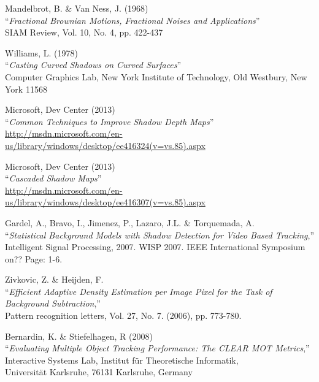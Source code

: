 \begin{thebibliography}{9}

	Mandelbrot, B. \& Van Ness, J. (1968) \\ 
	``\textit{Fractional Brownian Motions, Fractional Noises and Applications}'' \\
	SIAM Review, Vol. 10, No. 4, pp. 422-437
	
	Williams, L. (1978) \\ 
	``\textit{Casting Curved Shadows on Curved Surfaces}'' \\
	Computer Graphics Lab, New York Institute of Technology, Old Westbury, New York 11568 
	
	Microsoft, Dev Center (2013) \\ 
	``\textit{Common Techniques to Improve Shadow Depth Maps}'' \\
	\href{http://msdn.microsoft.com/en-us/library/windows/desktop/ee416324(v=vs.85).aspx}{http://msdn.microsoft.com/en-us/library/windows/desktop/ee416324(v=vs.85).aspx}
	
	Microsoft, Dev Center (2013) \\ 
	``\textit{Cascaded Shadow Maps}'' \\
	\href{http://msdn.microsoft.com/en-us/library/windows/desktop/ee416307(v=vs.85).aspx}{http://msdn.microsoft.com/en-us/library/windows/desktop/ee416307(v=vs.85).aspx}

	

	Gardel, A., Bravo, I., Jimenez, P., Lazaro, J.L. \& Torquemada, A.\\
	``\textit{Statistical Background Models with Shadow Detection for Video Based Tracking},''\\ Intelligent Signal Processing, 2007. WISP 2007. IEEE International Symposium on?? Page: 1-6.
	
	Zivkovic, Z. \& Heijden, F.\\
	``\textit{Efficient Adaptive Density Estimation per Image Pixel for the Task of Background Subtraction},''\\
	Pattern recognition letters, Vol. 27, No. 7. (2006), pp. 773-780.

	Bernardin, K. \& Stiefelhagen, R (2008)\\
	``\textit{Evaluating Multiple Object Tracking Performance: The CLEAR MOT Metrics},''\\
	Interactive Systems Lab, Institut für Theoretische Informatik,\\
	Universität Karlsruhe, 76131 Karlsruhe, Germany
	

\end{thebibliography}
